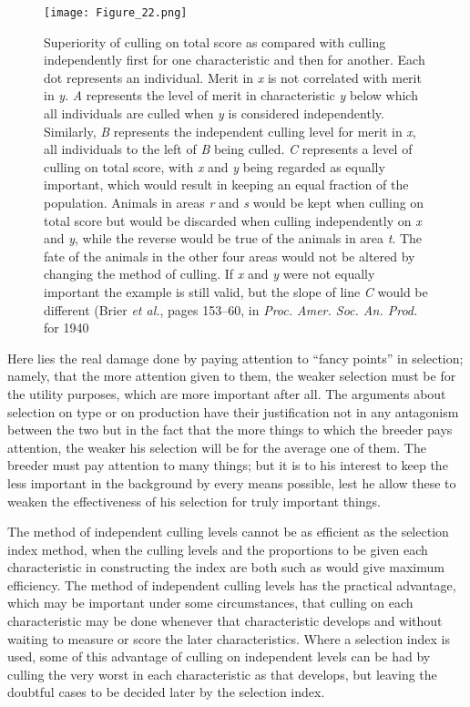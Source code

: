 \begin{figure}
	\centering
    \texttt{[image: Figure\_22.png]}
    \caption{Superiority of culling on total score as compared with culling independently
			 first for one characteristic and then for another. Each dot represents an individual.
			 Merit in \textit{x} is not correlated with merit in \textit{y}. \textit{A} represents the level of merit
			 in characteristic \textit{y} below which all individuals are culled when \textit{y} is considered
			 independently. Similarly, \textit{B} represents the independent culling level for merit in \textit{x},
			 all individuals to the left of \textit{B} being culled. \textit{C} represents a level of culling on total
			 score, with \textit{x} and \textit{y} being regarded as equally important, which would result in keeping
			 an equal fraction of the population. Animals in areas \textit{r} and \textit{s} would be kept when
			 culling on total score but would be discarded when culling independently on \textit{x} and
			 \textit{y}, while the reverse would be true of the animals in area \textit{t}. The fate of the animals
			 in the other four areas would not be altered by changing the method of culling. If \textit{x}
			 and \textit{y} were not equally important the example is still valid, but the slope of line \textit{C}
			 would be different (Brier \textit{et al.}, pages 153--60, in \textit{Proc. Amer. Soc. An. Prod.} for 1940}
    \label{fig:Lush_Figure_22}
\end{figure}

Here lies the real damage done by paying attention to ``fancy
points'' in selection; namely, that the more attention given to them, the
weaker selection must be for the utility purposes, which are more
important after all. The arguments about selection on type or on production
have their justification not in any antagonism between the two
but in the fact that the more things to which the breeder pays attention,
the weaker his selection will be for the average one of them. The
breeder must pay attention to many things; but it is to his interest to
keep the less important in the background by every means possible, lest
he allow these to weaken the effectiveness of his selection for truly
important things.

The method of independent culling levels cannot be as efficient as
the selection index method, when the culling levels and the proportions
to be given each characteristic in constructing the index are both such
as would give maximum efficiency. The method of independent culling
levels has the practical advantage, which may be important under some
circumstances, that culling on each characteristic may be done whenever
that characteristic develops and without waiting to measure or
score the later characteristics. Where a selection index is used, some of
this advantage of culling on independent levels can be had by culling
the very worst in each characteristic as that develops, but leaving the
doubtful cases to be decided later by the selection index.

